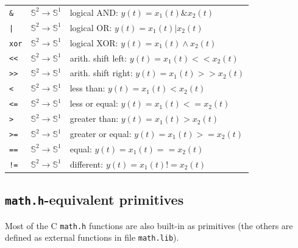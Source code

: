 \documentclass[a4paper,10pt]{book}
\begin{document}
\begin{tabular}{|l|l|l|}
\texttt{\&} & $\mathbb{S}^{2}\rightarrow\mathbb{S}^{1}$ & logical AND: $y(t)=x_{1}(t)\&x_{2}(t)$   \\
\texttt{|} & $\mathbb{S}^{2}\rightarrow\mathbb{S}^{1}$ & logical OR: $y(t)=x_{1}(t)|x_{2}(t)$   \\
\texttt{xor} & $\mathbb{S}^{2}\rightarrow\mathbb{S}^{1}$ & logical XOR: $y(t)=x_{1}(t)\land x_{2}(t)$   \\

\texttt{<<} & $\mathbb{S}^{2}\rightarrow\mathbb{S}^{1}$ & arith. shift left: $y(t)=x_{1}(t) << x_{2}(t)$   \\
\texttt{>>} & $\mathbb{S}^{2}\rightarrow\mathbb{S}^{1}$ & arith. shift right: $y(t)=x_{1}(t) >> x_{2}(t)$   \\


\texttt{<} & $\mathbb{S}^{2}\rightarrow\mathbb{S}^{1}$ & less than: $y(t)=x_{1}(t) < x_{2}(t)$   \\
\texttt{<=} & $\mathbb{S}^{2}\rightarrow\mathbb{S}^{1}$ & less or equal: $y(t)=x_{1}(t) <= x_{2}(t)$   \\
\texttt{>} & $\mathbb{S}^{2}\rightarrow\mathbb{S}^{1}$ & greater than: $y(t)=x_{1}(t) > x_{2}(t)$   \\
\texttt{>=} & $\mathbb{S}^{2}\rightarrow\mathbb{S}^{1}$ & greater or equal: $y(t)=x_{1}(t) >= x_{2}(t)$   \\
\texttt{==} & $\mathbb{S}^{2}\rightarrow\mathbb{S}^{1}$ & equal: $y(t)=x_{1}(t) == x_{2}(t)$   \\
\texttt{!=} & $\mathbb{S}^{2}\rightarrow\mathbb{S}^{1}$ & different: $y(t)=x_{1}(t) != x_{2}(t)$   \\

\hline

\end{tabular}

\bigskip


\subsection{\texttt{math.h}-equivalent primitives}

Most of the C \texttt{math.h} functions are also built-in as primitives (the others are defined as external functions in file \texttt{math.lib}).
\end{document}
